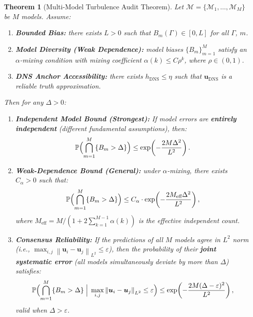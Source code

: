 \documentclass[11pt,a4paper]{article}
\newtheorem{theorem}{Theorem}[section]
\theoremstyle{definition}
\theoremstyle{remark}
\newcommand{\norm}[1]{\left\lVert#1\right\rVert}
\newcommand{\Kolmogorov}{\eta}
\begin{document}
\begin{theorem}[Multi-Model Turbulence Audit Theorem]
\label{thm:audit}
Let $\mathscr{M} = \{\mathcal{M}_1, \dots, \mathcal{M}_M\}$ be $M$ models. Assume:

\begin{enumerate}[label=(A\arabic*),leftmargin=*]
  \item \textbf{Bounded Bias:} there exists $L > 0$ such that $B_m(\Gamma) \in [0, L]$ for all $\Gamma$, $m$.
  \item \textbf{Model Diversity (Weak Dependence):} model biases $\{B_m\}_{m=1}^{M}$ satisfy an $\alpha$-mixing condition with mixing coefficient $\alpha(k) \leq C \rho^k$, where $\rho \in (0, 1)$.
  \item \textbf{DNS Anchor Accessibility:} there exists $h_{\text{DNS}} \leq \Kolmogorov$ such that $\bm{u}_{\text{DNS}}$ is a reliable truth approximation.
\end{enumerate}

Then for any $\Delta > 0$:

\begin{enumerate}[label=(\roman*),leftmargin=*]
  \item \textbf{Independent Model Bound (Strongest):} If model errors are \textbf{entirely independent} (different fundamental assumptions), then:
  \begin{equation}\label{eq:audit_independent}
    \mathbb{P}\Bigl(\bigcap_{m=1}^{M} \{B_m > \Delta\}\Bigr)
    \leq \exp\!\left(-\frac{2M\Delta^2}{L^2}\right).
  \end{equation}

  \item \textbf{Weak-Dependence Bound (General):} under $\alpha$-mixing, there exists $C_{\alpha} > 0$ such that:
  \begin{equation}\label{eq:audit_mixing}
    \mathbb{P}\Bigl(\bigcap_{m=1}^{M} \{B_m > \Delta\}\Bigr)
    \leq C_{\alpha} \cdot \exp\!\left(-\frac{2 M_{\text{eff}} \Delta^2}{L^2}\right),
  \end{equation}
  where $M_{\text{eff}} = M / (1 + 2\sum_{k=1}^{M-1} \alpha(k))$ is the effective independent count.

  \item \textbf{Consensus Reliability:} If the predictions of all $M$ models agree in $L^2$ norm (i.e., $\max_{i,j} \norm{\bm{u}_i - \bm{u}_j}_{L^2} \leq \varepsilon$), then the probability of their \textbf{joint systematic error} (all models simultaneously deviate by more than $\Delta$) satisfies:
  \begin{equation}\label{eq:audit_consensus}
    \mathbb{P}\Bigl(\bigcap_{m=1}^{M} \{B_m > \Delta\} \;\Big|\; \max_{i,j}\norm{\bm{u}_i - \bm{u}_j}_{L^2} \leq \varepsilon\Bigr)
    \leq \exp\!\left(-\frac{2M(\Delta - \varepsilon)^2}{L^2}\right),
  \end{equation}
  valid when $\Delta > \varepsilon$.
\end{enumerate}
\end{theorem}
\end{document}
